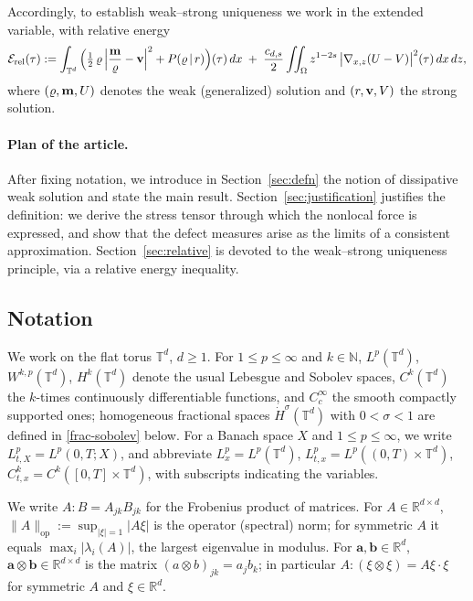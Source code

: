 \documentclass[12pt,a4paper,twoside]{article}
\newcommand{\vr}{\varrho}
\newcommand{\vv}{\vc{v}}
\newcommand{\vc}[1]{{\bf #1}}
\newcommand{\dx}{{\,\rm d} {x}}
\newcommand{\R}{\mathbb{R}}
\newcommand{\Erel}{\mathcal{E}_{\mathrm{rel}}}
\numberwithin{equation}{section}%
\newcommand{\vm}{\vc{m}}
\newcommand{\Gradxz}{\nabla_{x,z}}
\begin{document}
Accordingly, to establish weak--strong uniqueness we work
in the extended variable, with relative energy
\begin{equation}\label{RE:Def}
	\Erel(\tau)
	:= \int_{\mathbb T^d}\Big( \tfrac12\,\vr\, \Big|\frac{\vm}{\vr} - \vv\Big|^2
	+ P(\vr\,|\,r) \Big)(\tau)\,dx
	\;+\; \frac{c_{d,s}}{2}\iint_\Omega z^{1-2s}\,\big|\Gradxz (U-V)\big|^2(\tau)\,dx\,dz,
\end{equation}
where $(\vr,\vm,U)$ denotes the weak (generalized) solution and $(r,\vv,V)$ the strong solution.
	
	
	
\paragraph{Plan of the article.}
After fixing notation, we introduce in Section~\ref{sec:defn} the notion of dissipative weak solution and state the main result. Section~\ref{sec:justification} justifies the definition: we derive the stress tensor through which the nonlocal force is expressed, and show that the defect measures arise as the limits of a consistent approximation. Section~\ref{sec:relative} is devoted to the weak--strong uniqueness principle, via a relative energy inequality. 
 
\subsection{Notation}	\label{sec:notation}


We work on the flat torus $\mathbb T^d$, $d\ge1$. For $1\le p\le\infty$ and $k\in\mathbb N$, $L^p(\mathbb T^d)$, $W^{k,p}(\mathbb T^d)$, $H^k(\mathbb T^d)$ denote the usual Lebesgue and Sobolev spaces, $C^k(\mathbb T^d)$ the $k$-times continuously differentiable functions, and $C_c^\infty$ the smooth compactly supported ones; homogeneous fractional spaces $\dot H^\sigma(\mathbb T^d)$ with $0<\sigma <1$ are defined in \eqref{frac-sobolev} below. For a Banach space $X$  and $1\leq p\leq \infty$, we write $L^p_{t,X}=L^p(0,T;X)$, and abbreviate
$L^p_x=L^p(\mathbb T^d)$, $L^p_{t,x}=L^p((0,T)\times\mathbb T^d)$,
$C^k_{t,x}=C^k([0,T]\times\mathbb T^d)$, with subscripts indicating the variables.


 We write $A:B=A_{jk}B_{jk}$ for the Frobenius product of matrices. For $A\in\mathbb R^{d\times d}$, $\|A\|_{\mathrm{op}}:=\sup_{|\xi|=1}|A\xi|$ is the operator
(spectral) norm; for symmetric $A$ it equals $\max_i|\lambda_i(A)|$,
the largest eigenvalue in modulus.
For $\mathbf{a},\mathbf{b}\in\mathbb R^d$, $\mathbf{a}\otimes \mathbf{b}\in\mathbb R^{d\times d}$ is the matrix $(a\otimes b)_{jk}=a_j b_k$; in particular $A:(\xi\otimes\xi)=A\xi\cdot\xi$ for symmetric $A$ and $\xi \in \R^d$.
\end{document}
